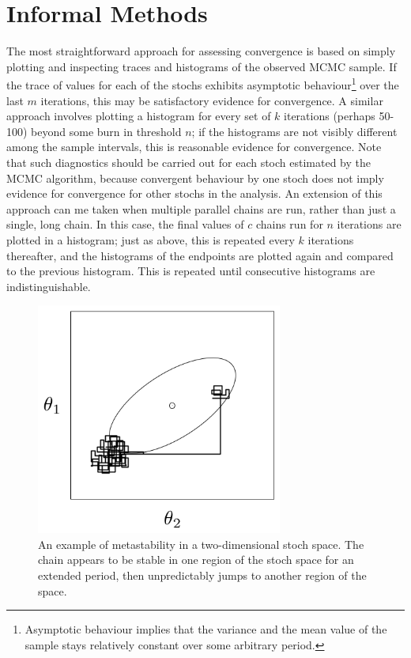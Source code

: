 \documentclass[]{book}
\begin{document}
\section*{Informal Methods}

The most straightforward approach for assessing convergence is based on simply plotting and inspecting traces and histograms of the observed MCMC sample. If the trace of values for each of the stochs exhibits asymptotic behaviour\footnote{Asymptotic behaviour implies that the variance and the mean value of the sample stays relatively constant over some arbitrary period.} over the last $m$ iterations, this may be satisfactory evidence for convergence. A similar approach involves plotting a histogram for every set of $k$ iterations (perhaps 50-100) beyond some burn in threshold $n$; if the histograms are not visibly different among the sample intervals, this is reasonable evidence for convergence. Note that such diagnostics should be carried out for each stoch estimated by the MCMC algorithm, because convergent behaviour by one stoch does not imply evidence for convergence for other stochs in the analysis. An extension of this approach can me taken when multiple parallel chains are run, rather than just a single, long chain. In this case, the final values of $c$ chains run for $n$ iterations are plotted in a histogram; just as above, this is repeated every $k$ iterations thereafter, and the histograms of the endpoints are plotted again and compared to the previous histogram. This is repeated until consecutive histograms are indistinguishable.

\begin{figure}[h]
\begin{center}
\includegraphics[height=3in]{metastable.png}
\caption{An example of metastability in a two-dimensional stoch space. The chain appears to be stable in one region of the stoch space for an extended period, then unpredictably jumps to another region of the space.}
\label{fig:metas}
\end{center}
\end{figure}
\end{document}
